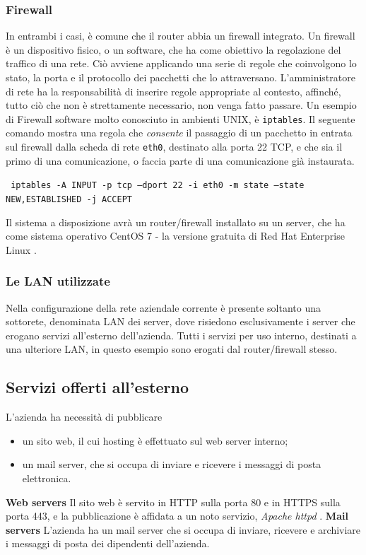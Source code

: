 \subsubsection{Firewall}
In entrambi i casi, è comune che il router abbia un firewall \cite{RFC2979} integrato.
Un firewall è un dispositivo fisico, o un software, che ha come obiettivo la regolazione del traffico di una rete.
Ciò avviene applicando una serie di regole che coinvolgono lo stato, la porta e il protocollo dei pacchetti che lo attraversano.
L'amministratore di rete ha la responsabilità di inserire regole appropriate al contesto, affinché, tutto ciò che non è strettamente necessario, non venga fatto passare.
Un esempio di Firewall software molto conosciuto in ambienti UNIX, è \texttt{iptables}.
Il seguente comando mostra una regola che \emph{consente} il passaggio di un pacchetto in entrata sul firewall dalla scheda di rete \texttt{eth0}, destinato alla porta 22 TCP, e che sia il primo di una comunicazione, o faccia parte di una comunicazione già instaurata.

\newpage
\texttt{
    iptables -A INPUT  -p tcp --dport 22 -i eth0 \linebreak
    -m state --state NEW,ESTABLISHED -j ACCEPT
}

Il sistema a disposizione avrà un router/firewall installato su un server, che ha come sistema operativo CentOS 7 \cite{CENTOS} - la versione gratuita di Red Hat Enterprise Linux \cite{RHEL}.

\subsubsection{Le LAN utilizzate}
Nella configurazione della rete aziendale corrente è presente soltanto una sottorete, denominata LAN dei server, dove risiedono esclusivamente i server che erogano servizi all'esterno dell'azienda. Tutti i servizi per uso interno, destinati a una ulteriore LAN, in questo esempio sono erogati dal router/firewall stesso.

\subsection{Servizi offerti all'esterno}
L'azienda ha necessità di pubblicare
\begin{itemize}
    \item un sito web, il cui hosting è effettuato sul web server interno;
    \item un mail server, che si occupa di inviare e ricevere i messaggi di posta elettronica.
\end{itemize}
\noindent \textbf{Web servers}
Il sito web è servito in HTTP sulla porta 80 e in HTTPS sulla porta 443, e la pubblicazione è affidata a un noto servizio, \emph{Apache httpd} \cite{APACHE}.
\noindent \textbf{Mail servers}
L'azienda ha un mail server che si occupa di inviare, ricevere e archiviare i messaggi di posta dei dipendenti dell'azienda.

